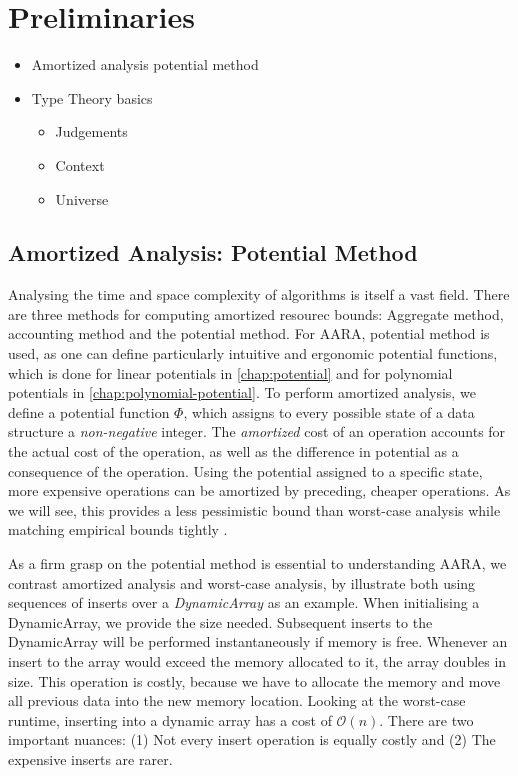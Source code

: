 \chapter{Preliminaries} \label{chap:preliminaries}

\begin{itemize}
	\item Amortized analysis potential method
	\item Type Theory basics
	   \begin{itemize}
	   	\item Judgements 
		\item Context
		\item Universe
	   \end{itemize}
\end{itemize}

\section{Amortized Analysis: Potential Method}
Analysing the time and space complexity of algorithms is itself a vast field. There are three methods for computing amortized resourec bounds: Aggregate method, accounting method and the potential method. For AARA, potential method is used, as one can define particularly intuitive and ergonomic potential functions, which is done for linear potentials in \ref{chap:potential} and for polynomial potentials in \ref{chap:polynomial-potential}.
To perform amortized analysis, we define a potential function \(\Phi\), which assigns to every possible state of a data structure a \emph{non-negative} integer. The \emph{amortized} cost of an operation accounts for the actual cost of the operation, as well as the difference in potential as a consequence of the operation. Using the potential assigned to a specific state, more expensive operations can be amortized by preceding, cheaper operations. As we will see, this provides a less pessimistic bound than worst-case analysis while matching empirical bounds tightly . 

As a firm grasp on the potential method is essential to understanding AARA, we contrast amortized analysis and worst-case analysis, by illustrate both using sequences of inserts over a \emph{DynamicArray} as an example. 
When initialising a DynamicArray, we provide the size needed. Subsequent inserts to the DynamicArray will be performed instantaneously if memory is free. Whenever an insert to the array would exceed the memory allocated to it, the array doubles in size.
This operation is costly, because we have to allocate the memory and move all previous data into the new memory location. Looking at the worst-case runtime, inserting into a dynamic array has a cost of \(\mathcal{O}(n)\). There are two important nuances: (1) Not every insert operation is equally costly and (2) The expensive inserts are rarer.

